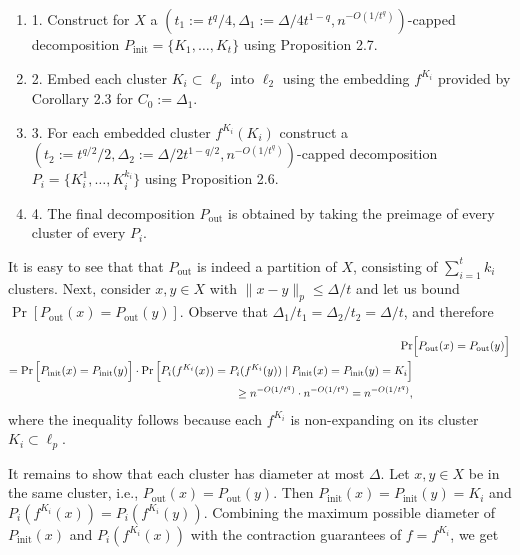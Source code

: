 \par
\begin{enumerate}
\item  1. 
Construct for $X$ a $(t_{1}:=t^{q}/4,\Delta_{1}:=\Delta/4t^{1-q},n^{-O(1/t^{q})})$-capped decomposition $P_{\text{init}}=\{K_{1},\ldots,K_{t}\}$ using Proposition 2.7.
\par
\par
\item  2. 
Embed each cluster $K_{i}\subset\ell_{p}$ into $\ell_{2}$ using the embedding $f^{K_{i}}$ provided by Corollary 2.3 for $C_{0}:=\Delta_{1}$.
\par
\par
\item  3. 
For each embedded cluster $f^{K_{i}}(K_{i})$ construct a $(t_{2}:=t^{q/2}/2,\Delta_{2}:=\Delta/2t^{1-q/2},n^{-O(1/t^{q})})$-capped decomposition $P_{i}=\{K_{i}^{1},\ldots,K_{i}^{k_{i}}\}$ using Proposition 2.6.
\par
\par
\item  4. 
The final decomposition $P_{\text{out}}$ is obtained by taking the preimage of every cluster of every $P_{i}$.
\par
\par
\end{enumerate}
\par
It is easy to see that that $P_{\text{out}}$ is indeed a partition of $X$, consisting of $\sum_{i=1}^{t}k_{i}$ clusters. Next, consider $x,y\in X$ with $\|x-y\|_{p}\leq\Delta/t$ and let us bound $\Pr[P_{\text{out}}(x)=P_{\text{out}}(y)]$. Observe that $\Delta_{1}/t_{1}=\Delta_{2}/t_{2}=\Delta/t$, and therefore
\par
\[\begin{aligned}
\displaystyle\Pr & \displaystyle\Big{[}P_{\text{out}}(x)=P_{\text{out}}(y)\Big{]} \\
\displaystyle=\Pr\Big{[}P_{\text{init}}(x)=P_{\text{init}}(y)\Big{]}\cdot\Pr%
\Big{[}P_{i}(f^{K_{i}}(x))=P_{i}(f^{K_{i}}(y))\mid P_{\text{init}}(x)=P_{\text%
{init}}(y)=K_{i}\Big{]} \\
\displaystyle\geq n^{-O\left(1/t^{q}\right)}\cdot n^{-O\left(1/t^{q}\right)}=n%
^{-O\left(1/t^{q}\right)},
\end{aligned}\]
where the inequality follows because each $f^{K_{i}}$ is non-expanding on its cluster $K_{i}\subset\ell_{p}$.
\par
\par
It remains to show that each cluster has diameter at most $\Delta$. Let $x,y\in X$ be in the same cluster, i.e., $P_{\text{out}}(x)=P_{\text{out}}(y)$. Then $P_{\text{init}}(x)=P_{\text{init}}(y)=K_{i}$ and $P_{i}(f^{K_{i}}(x))=P_{i}(f^{K_{i}}(y))$. Combining the maximum possible diameter of $P_{\text{init}}(x)$ and $P_{i}(f^{K_{i}}(x))$ with the contraction guarantees of $f=f^{K_{i}}$, we get
